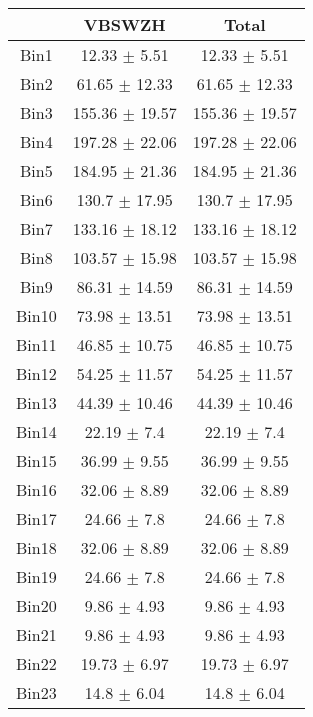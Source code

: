   \begin{tabular}{|c|c|c|}
  \hline
      & VBSWZH & Total \\ \cline{1-3} 
     \hline\hline
     Bin1 & 12.33 $\pm$ 5.51 & 12.33 $\pm$ 5.51 \\ \cline{1-3} 
     Bin2 & 61.65 $\pm$ 12.33 & 61.65 $\pm$ 12.33 \\ \cline{1-3} 
     Bin3 & 155.36 $\pm$ 19.57 & 155.36 $\pm$ 19.57 \\ \cline{1-3} 
     Bin4 & 197.28 $\pm$ 22.06 & 197.28 $\pm$ 22.06 \\ \cline{1-3} 
     Bin5 & 184.95 $\pm$ 21.36 & 184.95 $\pm$ 21.36 \\ \cline{1-3} 
     Bin6 & 130.7 $\pm$ 17.95 & 130.7 $\pm$ 17.95 \\ \cline{1-3} 
     Bin7 & 133.16 $\pm$ 18.12 & 133.16 $\pm$ 18.12 \\ \cline{1-3} 
     Bin8 & 103.57 $\pm$ 15.98 & 103.57 $\pm$ 15.98 \\ \cline{1-3} 
     Bin9 & 86.31 $\pm$ 14.59 & 86.31 $\pm$ 14.59 \\ \cline{1-3} 
     Bin10 & 73.98 $\pm$ 13.51 & 73.98 $\pm$ 13.51 \\ \cline{1-3} 
     Bin11 & 46.85 $\pm$ 10.75 & 46.85 $\pm$ 10.75 \\ \cline{1-3} 
     Bin12 & 54.25 $\pm$ 11.57 & 54.25 $\pm$ 11.57 \\ \cline{1-3} 
     Bin13 & 44.39 $\pm$ 10.46 & 44.39 $\pm$ 10.46 \\ \cline{1-3} 
     Bin14 & 22.19 $\pm$ 7.4 & 22.19 $\pm$ 7.4 \\ \cline{1-3} 
     Bin15 & 36.99 $\pm$ 9.55 & 36.99 $\pm$ 9.55 \\ \cline{1-3} 
     Bin16 & 32.06 $\pm$ 8.89 & 32.06 $\pm$ 8.89 \\ \cline{1-3} 
     Bin17 & 24.66 $\pm$ 7.8 & 24.66 $\pm$ 7.8 \\ \cline{1-3} 
     Bin18 & 32.06 $\pm$ 8.89 & 32.06 $\pm$ 8.89 \\ \cline{1-3} 
     Bin19 & 24.66 $\pm$ 7.8 & 24.66 $\pm$ 7.8 \\ \cline{1-3} 
     Bin20 & 9.86 $\pm$ 4.93 & 9.86 $\pm$ 4.93 \\ \cline{1-3} 
     Bin21 & 9.86 $\pm$ 4.93 & 9.86 $\pm$ 4.93 \\ \cline{1-3} 
     Bin22 & 19.73 $\pm$ 6.97 & 19.73 $\pm$ 6.97 \\ \cline{1-3} 
     Bin23 & 14.8 $\pm$ 6.04 & 14.8 $\pm$ 6.04 \\ \cline{1-3} 

\end{tabular}
